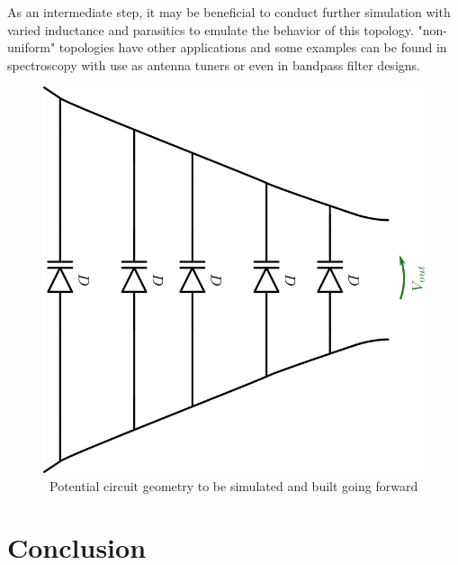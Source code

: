 \documentclass[journal]{IEEEtran}
\begin{document}
As an intermediate step, it may be beneficial to conduct further simulation with varied inductance and parasitics to emulate the behavior of this topology. "non-uniform" topologies have other applications and some examples can be found in spectroscopy\cite{palmer2014performance} with use as antenna tuners\cite{cure2012non} or even in bandpass filter designs\cite{NonUniformBandpass}.


\begin{figure}[htb]
\centering
\includegraphics[width=0.45\linewidth]{WeirdNTLTGeometry.png}
\caption{\ Potential circuit geometry to be simulated and built going forward
}\label{fig:WeirdGeo}
\end{figure}


\section{ Conclusion} 









 
 
 
 
 
 
 
 
 
 
 
 
 




\end{document}
